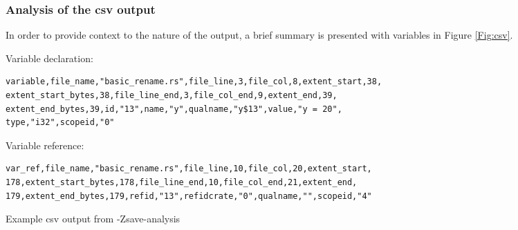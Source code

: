 
\subsubsection{Analysis of the csv output}
In order to provide context to the nature of the output, a brief summary is presented with variables in Figure \ref{Fig:csv}.

\begin{fig}
\vspace{5mm}
\noindent
Variable declaration:
\begin{verbatim}
variable,file_name,"basic_rename.rs",file_line,3,file_col,8,extent_start,38,
extent_start_bytes,38,file_line_end,3,file_col_end,9,extent_end,39,
extent_end_bytes,39,id,"13",name,"y",qualname,"y$13",value,"y = 20",
type,"i32",scopeid,"0"
\end{verbatim}

\noindent
Variable reference:
\begin{verbatim}
var_ref,file_name,"basic_rename.rs",file_line,10,file_col,20,extent_start,
178,extent_start_bytes,178,file_line_end,10,file_col_end,21,extent_end,
179,extent_end_bytes,179,refid,"13",refidcrate,"0",qualname,"",scopeid,"4"
\end{verbatim}

\caption{Example csv output from -Zsave-analysis}
\label{Fig:csv}
\end{fig}


